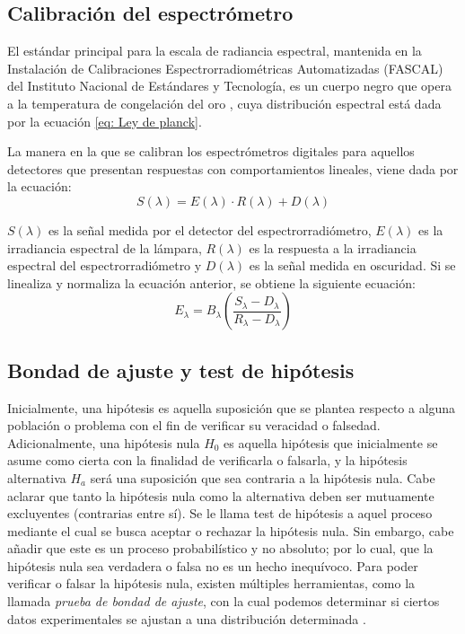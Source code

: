 \documentclass[twocolumn]{article}
\begin{document}
\subsection{Calibración del espectrómetro}
El estándar principal para la escala de radiancia espectral, mantenida en la Instalación de Calibraciones Espectrorradiométricas Automatizadas (FASCAL) del Instituto Nacional de Estándares y Tecnología, es un cuerpo negro que opera a la temperatura de congelación del oro \cite{Early1996Irradiance}, cuya distribución espectral está dada por la ecuación \ref{eq: Ley de planck}.

La manera en la que se calibran los espectrómetros digitales para aquellos detectores que presentan respuestas con comportamientos lineales, viene dada por la ecuación:
\[
    S(\lambda)= E(\lambda)\cdot R(\lambda) + D(\lambda)
\]

$S(\lambda)$ es la señal medida por el detector del espectrorradiómetro, $E(\lambda)$ es la irradiancia espectral de la lámpara, $R(\lambda)$ es la respuesta a la irradiancia espectral del espectrorradiómetro y $D(\lambda)$ es la señal medida en oscuridad. \cite{Rammeloo2023Spectroradiometer}
Si se linealiza y normaliza la ecuación anterior, se obtiene la siguiente ecuación:
\begin{equation}
    E_{\lambda}= B_{\lambda}(\frac{S_{\lambda}-D_{\lambda}}{R_{\lambda}-D_{\lambda}})
    \label{eq: ecuación de transferencia radiométrica relativa}
\end{equation}


\subsection{Bondad de ajuste y test de hipótesis}

Inicialmente, una hipótesis es aquella suposición que se plantea respecto a alguna población o problema con el fin de verificar su veracidad o falsedad. Adicionalmente, una hipótesis nula $H_0$ es aquella hipótesis que inicialmente se asume como cierta con la finalidad de verificarla o falsarla, y la hipótesis alternativa $H_a$ será una suposición que sea contraria a la hipótesis nula. Cabe aclarar que tanto la hipótesis nula como la alternativa deben ser mutuamente excluyentes (contrarias entre sí). Se le llama test de hipótesis a aquel proceso mediante el cual se busca aceptar o rechazar la hipótesis nula. Sin embargo, cabe añadir que este es un proceso probabilístico y no absoluto; por lo cual, que la hipótesis nula sea verdadera o falsa no es un hecho inequívoco. Para poder verificar o falsar la hipótesis nula, existen múltiples herramientas, como la llamada \textit{prueba de bondad de ajuste}, con la cual podemos determinar si ciertos datos experimentales se ajustan a una distribución determinada \cite{marques1991probabilidad}.
\end{document}

